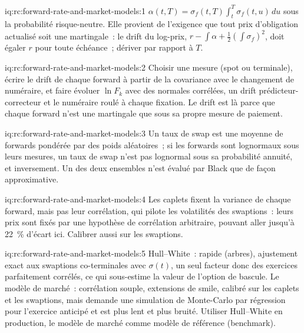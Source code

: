 \begin{solution}{iq:rc:forward-rate-and-market-models:1}
$\alpha(t,T)=\sigma_f(t,T)\int_t^T\sigma_f(t,u)\,du$ sous la probabilité risque-neutre. Elle
provient de l'exigence que tout prix d'obligation actualisé soit une martingale~: le
drift du log-prix, $r-\int\alpha+\frac12(\int\sigma_f)^2$, doit égaler $r$ pour toute
échéance~; dériver par rapport à $T$.
\end{solution}

\begin{solution}{iq:rc:forward-rate-and-market-models:2}
Choisir une mesure (spot ou terminale), écrire le drift de chaque forward à partir de la
covariance avec le changement de numéraire, et faire évoluer $\ln F_k$ avec des normales corrélées,
un drift prédicteur-correcteur et le numéraire roulé à chaque fixation. Le drift est
là parce que chaque forward n'est une martingale que sous sa propre mesure de paiement.
\end{solution}

\begin{solution}{iq:rc:forward-rate-and-market-models:3}
Un taux de swap est une moyenne de forwards pondérée par des poids aléatoires~; si les forwards sont
lognormaux sous leurs mesures, un taux de swap n'est pas lognormal sous sa probabilité annuité,
et inversement. Un des deux ensembles n'est évalué par Black que
de façon approximative.
\end{solution}

\begin{solution}{iq:rc:forward-rate-and-market-models:4}
Les caplets fixent la variance de chaque forward, mais pas leur corrélation, qui pilote
les volatilités des swaptions~: leurs prix sont fixés par une hypothèse de corrélation
arbitraire, pouvant aller jusqu'à 22~\% d'écart ici. Calibrer aussi sur les swaptions.
\end{solution}

\begin{solution}{iq:rc:forward-rate-and-market-models:5}
Hull--White~: rapide (arbres), ajustement exact aux swaptions co-terminales avec $\sigma(t)$, un seul facteur donc
des exercices parfaitement corrélés, ce qui sous-estime la valeur de l'option de bascule. Le modèle de
marché~: corrélation souple, extensions de smile, calibré sur les caplets et
les swaptions, mais demande une simulation de Monte-Carlo par régression pour l'exercice anticipé et est plus lent
et plus bruité. Utiliser Hull--White en production, le modèle de marché comme modèle de référence (benchmark).
\end{solution}

